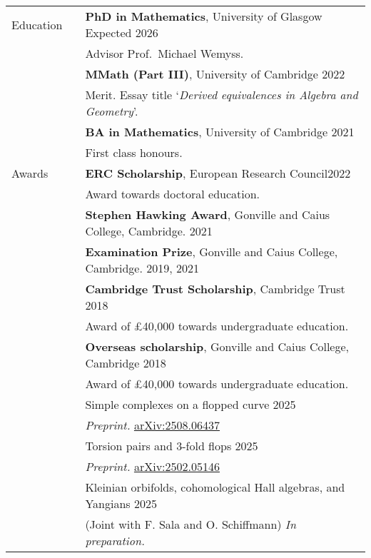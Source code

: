 \documentclass[10pt]{article}
\newcommand{\nextItem}{\\[0.25em]}
\newcommand{\nextSection}{\\[0.5em]}
\begin{document}
\begin{longtable}{>{\raggedleft\arraybackslash}p{0.8in}>{}p{0.05in}>{}p{5.7in}}
	Education%
	 &  & \textbf{PhD in Mathematics},
	University of Glasgow
	\hfill Expected 2026                                                                   \\
	 &  & Advisor Prof.\ Michael Wemyss.\nextItem%
	 &  & \textbf{MMath (Part III)},
	University of Cambridge
	\hfill 2022                                                                            \\
	 &  & Merit. Essay title `\emph{Derived equivalences in Algebra and
		Geometry}'.
	\nextItem%
	 &  & \textbf{BA in Mathematics},
	University of Cambridge
	\hfill 2021                                                                            \\
	 &  & First class honours.
	\nextSection%
	Awards%
	 &  & \textbf{ERC Scholarship}, European Research Council\hfill 2022                   \\
	 &  & Award towards doctoral education.\nextItem%
	 &  & \textbf{Stephen Hawking Award}, Gonville and Caius College,
	Cambridge. \hfill 2021\nextItem%
	 &  & \textbf{Examination Prize}, Gonville and Caius College, Cambridge.
	\hfill 2019, 2021\nextItem%
	 &  & \textbf{Cambridge Trust Scholarship}, Cambridge Trust \hfill 2018                \\
	 &  & Award of £40,000 towards undergraduate education.\nextItem%
	 &  & \textbf{Overseas scholarship}, Gonville and Caius College, Cambridge \hfill 2018 \\
	 &  & Award of £40,000 towards undergraduate education.\nextSection%
	\multirow{2}{0.8in}{\raggedleft\arraybackslash Publications \& preprints}%
	 &  & Simple complexes on a flopped curve \hfill 2025                                  \\
	 &  & \emph{Preprint.}
	\href{https://arxiv.org/abs/2508.06437}{arXiv:2508.06437}
	\nextItem%
	 &  & Torsion pairs and 3-fold flops \hfill 2025                                       \\
	 &  & \emph{Preprint.}
	\href{https://arxiv.org/abs/2502.05146}{arXiv:2502.05146}
	\nextItem%
	 &  & Kleinian orbifolds, cohomological Hall algebras, and Yangians
	\hfill 2025                                                                            \\
	 &  & (Joint with F. Sala and O. Schiffmann) \emph{In preparation.}

\end{longtable}
\end{document}
